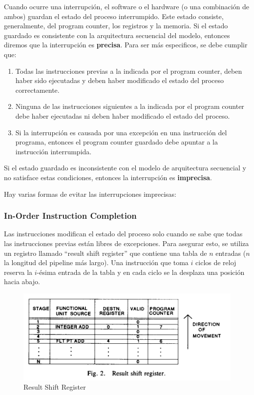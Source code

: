Cuando ocurre una interrupción, el software o el hardware (o una combinación de ambos) guardan el estado del proceso interrumpido. Este estado consiste, generalmente, del program counter, los registros y la memoria. Si el estado guardado es consistente con la arquitectura secuencial del modelo, entonces diremos que la interrupción es \textbf{precisa}. Para ser más especificos, se debe cumplir que:
\begin{enumerate}
	\item Todas las instrucciones previas a la indicada por el program counter, deben haber sido ejecutadas y deben haber modificado el estado del proceso correctamente.
	\item Ninguna de las instrucciones siguientes a la indicada por el program counter debe haber ejecutadas ni deben haber modificado el estado del proceso.
	\item Si la interrupción es causada por una excepción en una instrucción del programa, entonces el program counter guardado debe apuntar a la instrucción interrumpida.
\end{enumerate}

Si el estado guardado es inconsistente con el modelo de arquitectura secuencial y no satisface estas condiciones, entonces la interrupción es \textbf{imprecisa}. 

Hay varias formas de evitar las interrupciones imprecisas:

\subsubsection{In-Order Instruction Completion}
Las instrucciones modifican el estado del proceso solo cuando se sabe que todas las instrucciones previas están libres de excepciones. Para asegurar esto, se utiliza un registro llamado ``result shift register'' que contiene una tabla de $n$  entradas ($n$ la longitud del pipeline más largo). Una instrucción que toma $i$ ciclos de reloj reserva la $i$-ésima entrada de la tabla y en cada ciclo se la desplaza una posición hacia abajo.
\begin{figure}[h]
	\centering
	\includegraphics[width=0.5\linewidth]{imagenes/shift-register}
	\caption{Result Shift Register}
	\label{fig:shiftregister}
\end{figure}

